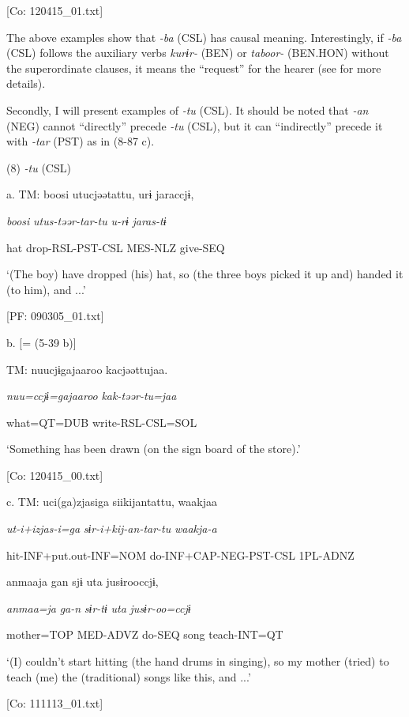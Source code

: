       [Co: 120415\_01.txt]

The above examples show that \textit{{}-ba} (CSL) has causal meaning. Interestingly, if \textit{{}-ba} (CSL) follows the auxiliary verbs \textit{kurɨr-} (BEN) or \textit{taboor-} (BEN.HON) without the superordinate clauses, it means the “request” for the hearer (see  for more details).

  Secondly, I will present examples of \textit{{}-tu} (CSL). It should be noted that \textit{-an} (NEG) cannot “directly” precede \textit{{}-tu} (CSL), but it can “indirectly” precede it with \textit{{}-tar} (PST) as in (8-87 c).

(8)  \textit{{}-tu} (CSL)

  a.  TM:  boosi  utucjəətattu,  urɨ  jaraccjɨ,

      \textit{boosi}  \textit{utus-təər-tar-tu}  \textit{u-rɨ}  \textit{jaras-tɨ}

      hat  drop-RSL-PST-CSL  MES-NLZ  give-SEQ

      ‘(The boy) have dropped (his) hat, so (the three boys picked it up and) handed it (to him), and ...’

      [PF: 090305\_01.txt]

  b.  [= (5-39 b)]

    TM:  nuucjɨgajaaroo  kacjəəttujaa.

      \textit{nuu=ccjɨ=gajaaroo}  \textit{kak-təər-tu=jaa}

      what=QT=DUB  write-RSL-CSL=SOL

      ‘Something has been drawn (on the sign board of the store).’

      [Co: 120415\_00.txt]

  c.  TM:  uci(ga)zjasiga  siikijantattu,  waakjaa

      \textit{ut-i+izjas-i=ga}  \textit{sɨr-i+kij-an-tar-tu}  \textit{waakja-a}

      hit-INF+put.out-INF=NOM  do-INF+CAP-NEG-PST-CSL  1PL-ADNZ

      anmaaja  gan  sjɨ  uta  jusɨrooccjɨ,

      \textit{anmaa=ja}  \textit{ga-n}  \textit{sɨr-tɨ}  \textit{uta}  \textit{jusɨr-oo=ccjɨ}

      mother=TOP  MED-ADVZ  do-SEQ  song  teach-INT=QT

      ‘(I) couldn’t start hitting (the hand drums in singing), so my mother (tried) to teach (me) the (traditional) songs like this, and ...’

      [Co: 111113\_01.txt]

